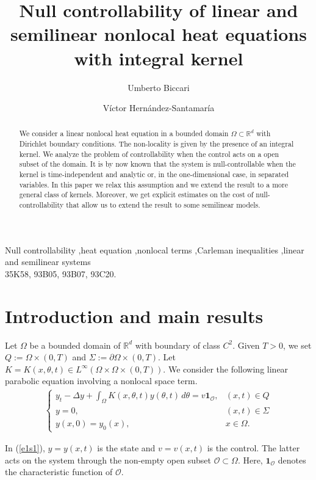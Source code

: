 \documentclass[preprint,1p]{elsarticle}
\title{{\bf Null controllability of linear and semilinear nonlocal heat equations with integral kernel}}
\author[rvt,els]{Umberto Biccari \corref{cor1}}
\author[rvt,els]{V\'ictor Hern\'andez-Santamar\'ia}
\newcommand{\D}{\displaystyle}
\newcommand{\R}{\mathbb{R}}
\begin{document}
           

\begin{abstract}
We consider a linear nonlocal heat equation in a bounded domain $\Omega\subset\R^d$ with Dirichlet boundary conditions. The non-locality is given by the presence of an integral kernel. We analyze the problem of controllability when the control acts on a open subset of the domain. It is by now known that the system is null-controllable when the kernel is time-independent and analytic or, in the one-dimensional case, in separated variables. In this paper we relax this assumption and we extend the result to a more general class of kernels. Moreover, we get explicit estimates on the cost of null-controllability that allow us to extend the result to some semilinear models.
\end{abstract}

\begin{keyword}
	Null controllability \sep heat equation \sep nonlocal terms \sep Carleman inequalities \sep linear and semilinear systems
	\\
	\MSC[2010] 35K58, 93B05, 93B07, 93C20.
\end{keyword}

\maketitle

\section{Introduction and main results}\label{intro_sec}
Let $\Omega$ be a bounded domain of $\R^d$ with boundary of class $C^2$. Given $T>0$, we set $Q:=\Omega\times (0,T)$ and $\Sigma:=\partial\Omega\times (0,T)$. Let $K=K(x,\theta,t)\in L^\infty(\Omega\times\Omega\times(0,T))$.  We consider the following linear parabolic equation involving a nonlocal space term. 
\begin{align}\label{e1s1}
	\begin{cases}
		\D y_t - \Delta y + \int_\Omega K(x,\theta,t)y(\theta,t)\,d\theta = v\mathbf{1}_{\mathcal O}, & (x,t)\in Q
		\\
		y = 0, & (x,t)\in\Sigma
		\\
		y(x,0) = y_0(x), & x\in\Omega.
	\end{cases}
\end{align}

In (\ref{e1s1}), $y=y(x,t)$ is the state and $v=v(x,t)$ is the control. The latter acts on the system through the non-empty open subset ${\mathcal O}\subset\Omega$. Here, $\mathbf{1}_{\mathcal O}$ denotes the characteristic function of $\mathcal O$. 
\end{document}
